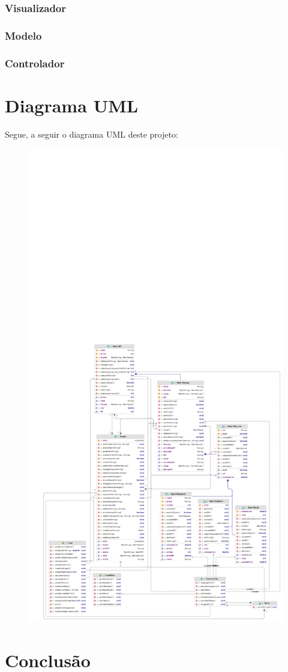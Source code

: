 \documentclass[10pt, a4paper]{article}
\begin{document}
\subsubsection{Visualizador}
\lipsum[1]
\subsubsection{Modelo}
\lipsum[2]
\subsubsection{Controlador}
\lipsum[2]
\section{Diagrama UML}
Segue, a seguir o diagrama UML deste projeto:
\begin{figure}
        \centering
        \includegraphics[width=\textwidth]{diagram.png}
\end{figure}

\newpage
\section{Conclusão}
\lipsum[1-2]
\end{document}
